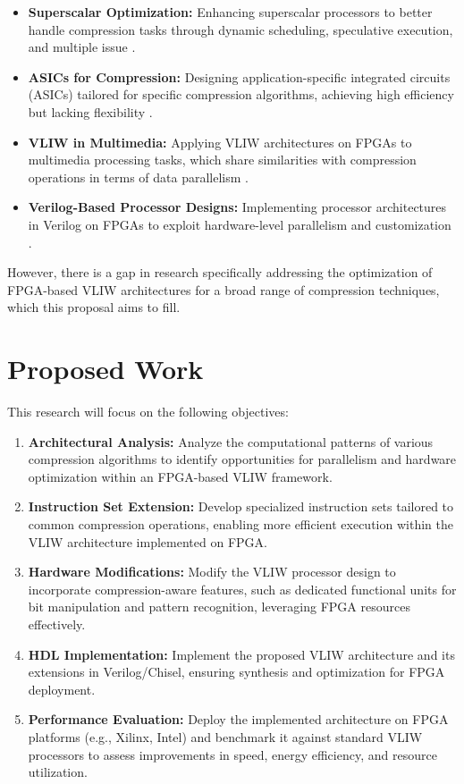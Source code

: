\documentclass[sigconf]{acmart}
\begin{document}
	\begin{itemize}
		\item \textbf{Superscalar Optimization:} Enhancing superscalar processors to better handle compression tasks through dynamic scheduling, speculative execution, and multiple issue \cite{smith2006superscalar}.
		\item \textbf{ASICs for Compression:} Designing application-specific integrated circuits (ASICs) tailored for specific compression algorithms, achieving high efficiency but lacking flexibility \cite{johnson2010asic}.
		\item \textbf{VLIW in Multimedia:} Applying VLIW architectures on FPGAs to multimedia processing tasks, which share similarities with compression operations in terms of data parallelism \cite{6136855}.
		\item \textbf{Verilog-Based Processor Designs:} Implementing processor architectures in Verilog on FPGAs to exploit hardware-level parallelism and customization \cite{kim2015verilog}.
	\end{itemize}
	
	However, there is a gap in research specifically addressing the optimization of FPGA-based VLIW architectures for a broad range of compression techniques, which this proposal aims to fill.
	
	\section{Proposed Work}
	This research will focus on the following objectives:
	
	\begin{enumerate}
		\item \textbf{Architectural Analysis:} Analyze the computational patterns of various compression algorithms to identify opportunities for parallelism and hardware optimization within an FPGA-based VLIW framework.
		\item \textbf{Instruction Set Extension:} Develop specialized instruction sets tailored to common compression operations, enabling more efficient execution within the VLIW architecture implemented on FPGA.
		\item \textbf{Hardware Modifications:} Modify the VLIW processor design to incorporate compression-aware features, such as dedicated functional units for bit manipulation and pattern recognition, leveraging FPGA resources effectively.
		\item \textbf{HDL Implementation:} Implement the proposed VLIW architecture and its extensions in Verilog/Chisel, ensuring synthesis and optimization for FPGA deployment.
		\item \textbf{Performance Evaluation:} Deploy the implemented architecture on FPGA platforms (e.g., Xilinx, Intel) and benchmark it against standard VLIW processors to assess improvements in speed, energy efficiency, and resource utilization.
	\end{enumerate}
	
\end{document}
